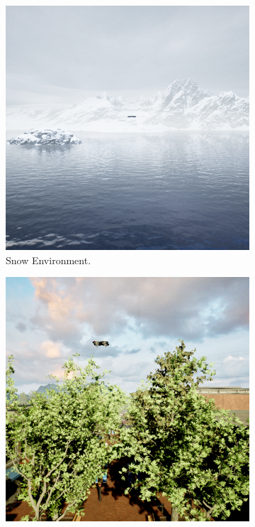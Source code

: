 \documentclass[twoside]{ctuthesis}
\theoremstyle{plain}
\theoremstyle{definition}
\theoremstyle{note}
\begin{document}
\begin{figure}
	\centering
	\begin{subfigure}[b]{0.3\textwidth}
		\centering
		\includegraphics[width=\textwidth]{snow_rgb.png}
		\caption{Snow Environment.}
	\end{subfigure}
	\hfill
	\begin{subfigure}[b]{0.3\textwidth}
		\centering
		\includegraphics[width=\textwidth]{city_rgb.png}

\end{subfigure}
\end{figure}
\end{document}
